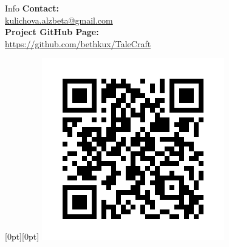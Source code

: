\documentclass[portrait,a0paper,fontscale=0.33]{baposter}
\begin{document}
\begin{poster}
\begin{posterbox}[column=1, name=info, below=conclusion]{Info}
\vspace{5mm}
    \textbf{Contact:} \\
    \href{mailto:kulichova.alzbeta@gmail.com}{kulichova.alzbeta@gmail.com} \\[1ex]
    \textbf{Project GitHub Page:} \\
    \href{https://github.com/bethkux/TaleCraft}{https://github.com/bethkux/TaleCraft}\\
    



\begin{flushright}
\raisebox{10pt}[0pt][0pt]{%
\includegraphics[width=0.22\linewidth]{img/qr.png}%
}
\end{flushright}
\end{posterbox}




\end{poster}
\end{document}
